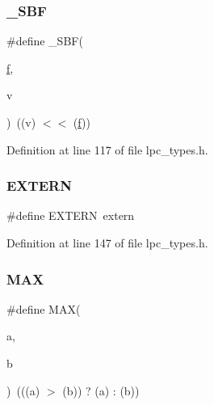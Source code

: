 \mbox{\label{group___l_p_c___types___public___macros_ga6caca3483c2ce446900be05ea02e8f49}} 
\subsubsection{\texorpdfstring{\+\_\+\+S\+BF}{\_SBF}}
{\footnotesize\ttfamily \#define \+\_\+\+S\+BF(\begin{DoxyParamCaption}\item[{}]{\hyperlink{unity_8c_af900396d7b72ff2a7002e8befe8cf8f1}{f},  }\item[{}]{v }\end{DoxyParamCaption})~((v) $<$$<$ (\hyperlink{unity_8c_af900396d7b72ff2a7002e8befe8cf8f1}{f}))}



Definition at line 117 of file lpc\+\_\+types.\+h.

\mbox{\label{group___l_p_c___types___public___macros_ga77366c1bd428629dc898e188bfd182a3}} 
\subsubsection{\texorpdfstring{E\+X\+T\+E\+RN}{EXTERN}}
{\footnotesize\ttfamily \#define E\+X\+T\+E\+RN~extern}



Definition at line 147 of file lpc\+\_\+types.\+h.

\mbox{\label{group___l_p_c___types___public___macros_gafa99ec4acc4ecb2dc3c2d05da15d0e3f}} 
\subsubsection{\texorpdfstring{M\+AX}{MAX}}
{\footnotesize\ttfamily \#define M\+AX(\begin{DoxyParamCaption}\item[{}]{a,  }\item[{}]{b }\end{DoxyParamCaption})~(((a) $>$ (b)) ? (a) \+: (b))}



